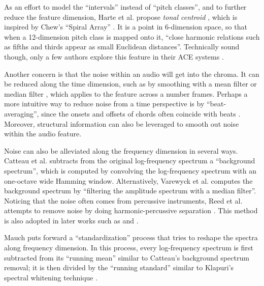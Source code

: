 As an effort to model the ``intervals'' instead of ``pitch classes'', and to further reduce the feature dimension, Harte et al. propose {\it tonal centroid} \cite{harte2006detecting}, which is inspired by Chew's ``Spiral Array'' \cite{chew2000towards}. It is a point in 6-dimension space, so that when a 12-dimension pitch class is mapped onto it, ``close harmonic relations such as fifths and thirds appear as small Euclidean distances''. Technically sound though, only a few authors explore this feature in their ACE systems \cite{lee2008acoustic,humphrey2012learning}.
 
Another concern is that the noise within an audio will get into the chroma. It can be reduced along the time dimension, such as by smoothing with a mean filter \cite{harte2005automatic,humphrey2012rethinking} or median filter \cite{khadkevich2009use,mauch2008discrete}, which applies to the feature across a number frames. Perhaps a more intuitive way to reduce noise from a time perspective is by ``beat-averaging''\cite{bello2005robust,mauch2010approximate}, since the onsets and offsets of chords often coincide with beats \cite{goto1999real}. Moreover, structural information can also be leveraged \cite{mauch2009using,cho2011feature,cho2014improved} to smooth out noise within the audio feature.

Noise can also be alleviated along the frequency dimension in several ways. Catteau et al. \cite{catteau2007probabilistic} subtracts from the original log-frequency spectrum a ``background spectrum'', which is computed by convolving the log-frequency spectrum with an one-octave wide Hamming window. Alternatively, Varewyck et al. \cite{varewyck2008novel} computes the background spectrum by ``filtering the amplitude spectrum with a median filter''. Noticing that the noise often comes from percussive instruments, Reed et al. \cite{reed2009minimum} attempts to remove noise by doing harmonic-percussive separation \cite{ono2008separation}. This method is also adopted in later works such as \cite{ni2012end} and \cite{ueda2010hmm}.

Mauch \cite{mauch2010automatic} puts forward a ``standardization'' process that tries to reshape the spectra along frequency dimension. In this process, every log-frequency spectrum is first subtracted from its ``running mean'' similar to Catteau's background spectrum removal; it is then divided by the ``running standard'' similar to Klapuri's spectral whitening technique \cite{klapuri2006multiple}.

